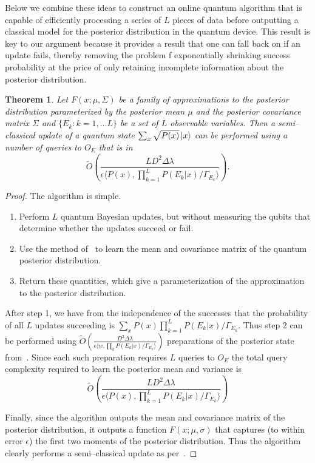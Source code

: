 \documentclass[aps,amsmath,onecolumn,amssymb]{revtex4}
\newtheorem{theorem}{Theorem}
\begin{document}
Below we combine these ideas to construct an online quantum algorithm that is capable of efficiently processing a series of $L$ pieces of data before outputting a classical model for the posterior distribution in the quantum device.  This result is key to our argument because it provides a result that one can fall back on if an update fails, thereby removing the problem f exponentially shrinking success probability at the price of only retaining incomplete information about the posterior distribution.

\begin{theorem}
Let $F(x;\mu, \Sigma)$ be a family of approximations to the posterior distribution parameterized by the posterior mean $\mu$ and the posterior covariance matrix $\Sigma$ and $\{E_k: k=1,\ldots L\}$ be a set of $L$ observable variables.  Then a semi--classical update of a quantum state $\sum_x \sqrt{P(x)} \left|x\right\rangle$ can be performed using a number of queries to $O_E$ that is in
$$
\tilde{O} \left(\frac{LD^2 \Delta \lambda }{\epsilon \langle  P(x), \prod_{k=1}^LP(E_k|x)/\Gamma_{E_k}\rangle} \right).
$$
\end{theorem}
\begin{proof}
The algorithm is simple.  
\begin{enumerate}
\item Perform $L$ quantum Bayesian updates, but without measuring the qubits that determine whether the updates succeed or fail.
\item Use the method of~ to learn the mean and covariance matrix of the quantum posterior distribution.
\item Return these quantities, which give a parameterization of the approximation to the posterior distribution.
\end{enumerate}

After step 1, we have from the independence of the successes that the probability of all $L$ updates succeeding is $\sum_x P(x) \prod_{k=1}^L P(E_k|x)/\Gamma_{E_k}$.  Thus step 2 can be performed using $\tilde{O}\left(\frac{D^2\Delta \lambda }{\epsilon \langle w, \prod_k P(E_k|x)/\Gamma_{E_k}\rangle}\right)$ preparations of the posterior state from~.  Since each such preparation requires $L$ queries to $O_E$ the total query complexity required to learn the posterior mean and variance is
\begin{equation}
\tilde{O} \left(\frac{LD^2 \Delta \lambda }{\epsilon \langle  P(x), \prod_{k=1}^LP(E_k|x)/\Gamma_{E_k}\rangle} \right)
\end{equation}

Finally, since the algorithm outputs the mean and covariance matrix of the posterior distribution, it outputs a function $F(x;\mu,\sigma)$ that captures (to within error $\epsilon$) the first two moments of the posterior distribution.  Thus the algorithm clearly performs a semi--classical update as per~.
\end{proof}
\end{document}

